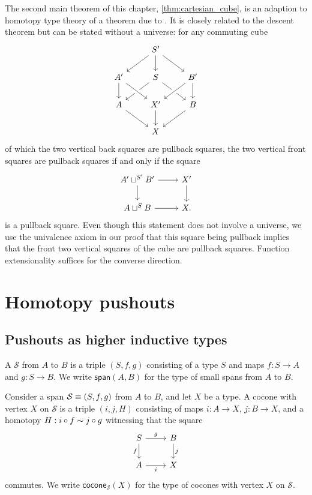 The second main theorem of this chapter, \cref{thm:cartesian_cube}, is an adaption to homotopy type theory of a theorem due to \cite{AnelBiedermanFinsterJoyal}. It is closely related to the descent theorem but can be stated without a universe: for any commuting cube
\begin{equation*}
\begin{tikzcd}
& S' \arrow[dl] \arrow[dr] \arrow[d] \\
A' \arrow[d] & S \arrow[dl] \arrow[dr] & B' \arrow[dl,crossing over] \arrow[d] \\
A \arrow[dr] & X' \arrow[d] \arrow[from=ul,crossing over] & B \arrow[dl] \\
& X
\end{tikzcd}
\end{equation*}
of which the two vertical back squares are pullback squares, the two vertical front squares are pullback squares if and only if the square
\begin{equation*}
\begin{tikzcd}
A' \sqcup^{S'} B' \arrow[r] \arrow[d] & X' \arrow[d] \\
A\sqcup^{S} B \arrow[r] & X.
\end{tikzcd}
\end{equation*}
is a pullback square. Even though this statement does not involve a universe, we use the univalence axiom in our proof that this square being pullback implies that the front two vertical squares of the cube are pullback squares. Function extensionality suffices for the converse direction.

\section{Homotopy pushouts}

\subsection{Pushouts as higher inductive types}

\begin{defn}
A  $\mathcal{S}$ from $A$ to $B$ is a triple $(S,f,g)$ consisting of a type $S$ and maps $f:S\to A$ and $g:S\to B$. We write $\mathsf{span}(A,B)$ for the type of small spans from $A$ to $B$. 
\end{defn}

\begin{defn}
Consider a span $\mathcal{S}\equiv (S,f,g)$ from $A$ to $B$, and let $X$ be a type. A cocone with vertex $X$ on $\mathcal{S}$ is a triple $(i,j,H)$ consisting of maps $i:A\to X$, $j:B\to X$, and a homotopy $H:i\circ f\sim j\circ g$ witnessing that the square
\begin{equation*}
\begin{tikzcd}
S \arrow[d,swap,"f"] \arrow[r,"g"] & B \arrow[d,"j"] \\
A \arrow[r,swap,"i"] & X
\end{tikzcd}
\end{equation*}
commutes. We write $\mathsf{cocone}_{\mathcal{S}}(X)$ for the type of cocones with vertex $X$ on $\mathcal{S}$. 
\end{defn}

